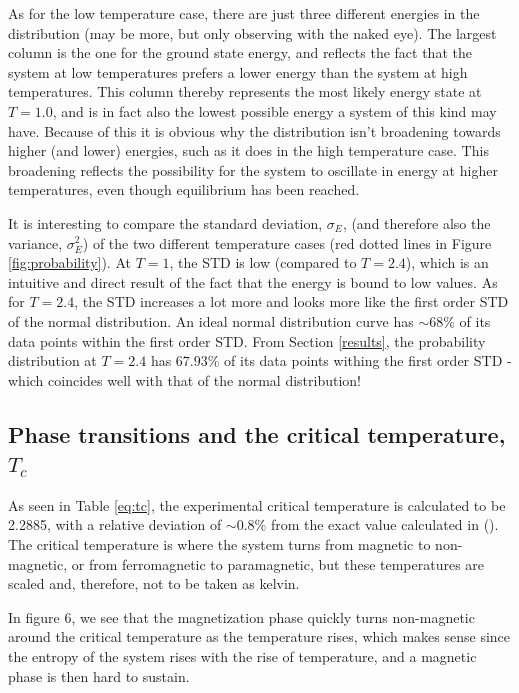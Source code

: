 \documentclass[12pt,english,a4paper]{article}
\begin{document}
As for the low temperature case, there are just three different energies in the distribution (may be more, but only observing with the naked eye). The largest column is the one for the ground state energy, and reflects the fact that the system at low temperatures prefers a lower energy than the system at high temperatures. This column thereby represents the most likely energy state at $T=1.0$, and is in fact also the lowest possible energy a system of this kind may have. Because of this it is obvious why the distribution isn't broadening towards higher (and lower) energies, such as it does in the high temperature case. This broadening reflects the possibility for the system to oscillate in energy at higher temperatures, even though equilibrium has been reached.

It is interesting to compare the standard deviation, $\sigma_E$, (and therefore also the variance, $\sigma_E^2$) of the two different temperature cases (red dotted lines in Figure \ref{fig:probability}). At $T=1$, the STD is low (compared to $T=2.4$), which is an intuitive and direct result of the fact that the energy is bound to low values. As for $T=2.4$, the STD increases a lot more and looks more like the first order STD of the normal distribution. An ideal normal distribution curve has $\sim 68\%$ of its data points within the first order STD. From Section \ref{results}, the probability distribution at $T=2.4$ has $67.93\%$ of its data points withing the first order STD - which coincides well with that of the normal distribution!

\subsection{Phase transitions and the critical temperature, $T_c$}

As seen in Table \ref{eq:tc}, the experimental critical temperature is calculated to be 2.2885, with a relative deviation of $\sim 0.8\%$ from the exact value calculated in (\cite{LarsOns}). The critical temperature is where the system turns from magnetic to non-magnetic, or from ferromagnetic to paramagnetic, but these temperatures are scaled and, therefore, not to be taken as kelvin. 

In figure 6, we see that the magnetization phase quickly turns non-magnetic around the critical temperature as the temperature rises, which makes sense since the entropy of the system rises with the rise of temperature, and a magnetic phase is then hard to sustain. 
\end{document}
